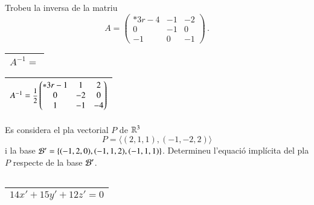 \documentclass[11pt,catalan]{article}
\begin{document}
\begin{enunciat}
Trobeu la inversa de la matriu 
\[
  A = \begin{pmatrix}{*{3}r} -4 & -1 & -2\\ 0 & -1 & 0\\ -1 & 0 & -1\end{pmatrix}\,.
\]
\end{enunciat}

\begin{quadricula}
\begin{tabular}{|L{5cm}{1.25cm}|}
\hline
$A^{-1}=$ \\
\hline
\end{tabular}
\end{quadricula}

\begin{solucio}
\begin{center}
\begin{tabular}{|C{5cm}{1.25cm}|}
\hline
$A^{-1}=\deufrac{1}{2}\begin{pmatrix}{*{3}r} -1 & 1 & 2\\ 0 & -2 & 0\\ 1 & -1 & -4\end{pmatrix}$ \\
\hline
\end{tabular}
\end{center}
\end{solucio}


\begin{enunciat}
Es considera el pla vectorial $P$ de $\rn 3$
\[
  P = \langle (2,1,1), (-1,-2,2) \rangle
\]
i la base $\cal B'=\{(-1,2,0),(-1,1,2),(-1,1,1)\}$. Determineu l'equació implícita del pla $P$ respecte de la base $\cal B'$.
\end{enunciat}

\begin{quadricula}
\begin{tabular}{|C{5cm}{0.5cm}|}
\hline
 \\
\hline
\end{tabular}
\end{quadricula}

\begin{solucio}
\begin{center}
\begin{tabular}{|C{5cm}{0.5cm}|}
\hline
$14 x' + 15 y' + 12 z' = 0$ \\
\hline
\end{tabular}
\end{center}
\end{solucio}
\end{document}
